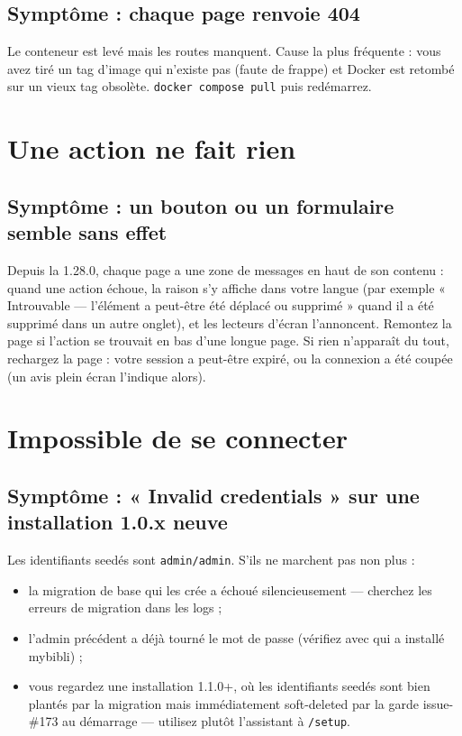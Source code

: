 \subsection*{Symptôme : chaque page renvoie 404}

Le conteneur est levé mais les routes manquent. Cause la plus
fréquente : vous avez tiré un tag d'image qui n'existe pas (faute
de frappe) et Docker est retombé sur un vieux tag obsolète.
\texttt{docker compose pull} puis redémarrez.

\section{Une action ne fait rien}\label{sec:troubleshoot-action-silent}

\subsection*{Symptôme : un bouton ou un formulaire semble sans effet}

Depuis la 1.28.0, chaque page a une zone de messages en haut de son
contenu : quand une action échoue, la raison s'y affiche dans votre
langue (par exemple « Introuvable — l'élément a peut-être été déplacé
ou supprimé » quand il a été supprimé dans un autre onglet), et les
lecteurs d'écran l'annoncent. Remontez la page si l'action se trouvait
en bas d'une longue page. Si rien n'apparaît du tout, rechargez la
page : votre session a peut-être expiré, ou la connexion a été coupée
(un avis plein écran l'indique alors).

\section{Impossible de se connecter}

\subsection*{Symptôme : « Invalid credentials » sur une installation 1.0.x neuve}

Les identifiants seedés sont \texttt{admin/admin}. S'ils ne marchent
pas non plus :

\begin{itemize}
  \item la migration de base qui les crée a échoué silencieusement
        — cherchez les erreurs de migration dans les logs ;
  \item l'admin précédent a déjà tourné le mot de passe (vérifiez
        avec qui a installé mybibli) ;
  \item vous regardez une installation 1.1.0+, où les identifiants
        seedés sont bien plantés par la migration mais immédiatement
        soft-deleted par la garde issue-\#173 au démarrage —
        utilisez plutôt l'assistant à \texttt{/setup}.
\end{itemize}

